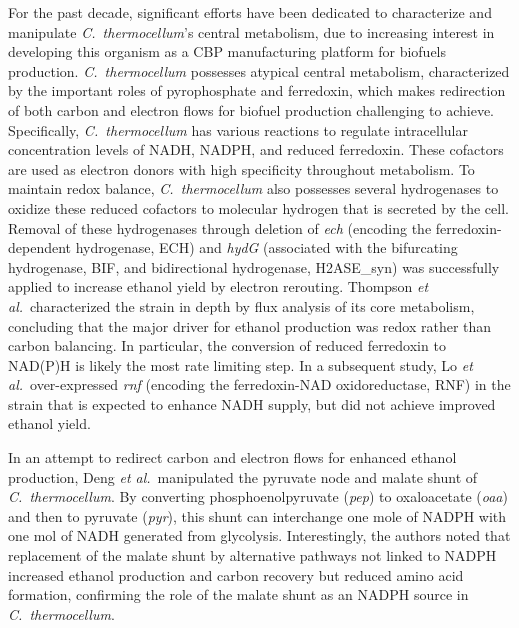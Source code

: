 For the past decade, significant efforts have been dedicated to characterize and manipulate \textit{C.~thermocellum}'s central metabolism, due to increasing interest in developing this organism as a CBP manufacturing platform for biofuels production.\citep{akinosho2014}
\textit{C.~thermocellum} possesses atypical central metabolism, characterized by the important roles of pyrophosphate and ferredoxin,\citep{zhou2013} which makes redirection of both carbon and electron flows for biofuel production challenging to achieve.
Specifically, \textit{C.~thermocellum} has various reactions to regulate intracellular concentration levels of NADH, NADPH, and reduced ferredoxin. These cofactors are used as electron donors with high specificity throughout metabolism. To maintain redox balance, \textit{C.~thermocellum} also possesses several hydrogenases to oxidize these reduced cofactors to molecular hydrogen that is secreted by the cell. Removal of these hydrogenases through deletion of \textit{ech} (encoding the ferredoxin-dependent hydrogenase, ECH) and \textit{hydG} (associated with the bifurcating hydrogenase, BIF, and bidirectional hydrogenase, H2ASE\_syn) was successfully applied to increase ethanol yield by electron rerouting.\citep{biswas2015} Thompson \textit{et al.}\citep{thompson2015}\ characterized the  strain in depth by flux analysis of its core metabolism, concluding that the major driver for ethanol production was redox rather than carbon balancing. In particular, the conversion of reduced ferredoxin to NAD(P)H is likely the most rate limiting step.
In a subsequent study, Lo \textit{et al.}\citep{lo2017}\ over-expressed \textit{rnf} (encoding the ferredoxin-NAD oxidoreductase, RNF) in the  strain that is expected to enhance NADH supply, but did not achieve improved ethanol yield.


In an attempt to redirect carbon and electron flows for enhanced ethanol production, Deng \textit{et al.}\citep{deng2013}\ manipulated the pyruvate node and malate shunt of  \textit{C.~thermocellum}. By converting phosphoenolpyruvate (\textit{pep}) to oxaloacetate (\textit{oaa}) and then to pyruvate (\textit{pyr}), this shunt can interchange one mole of NADPH with one mol of NADH generated from glycolysis. Interestingly, the authors noted that replacement of the malate shunt by alternative pathways not linked to NADPH increased ethanol production and carbon recovery but reduced amino acid formation, confirming the role of the malate shunt as an NADPH source in \textit{C.~thermocellum}.


